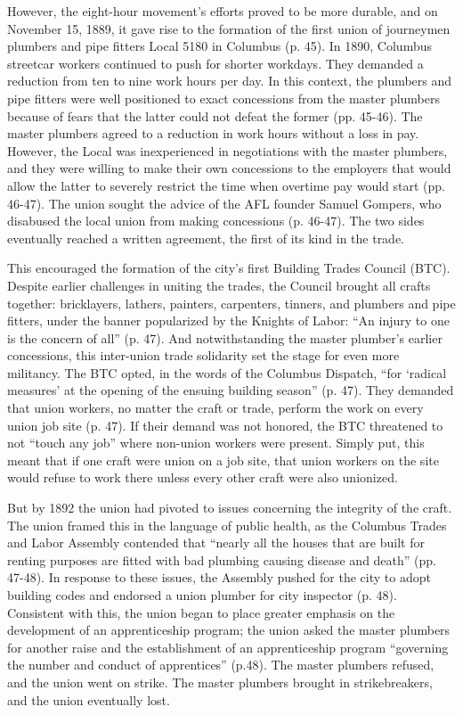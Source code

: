 However, the eight-hour movement’s efforts proved to be more durable, and on November 15, 1889, it gave rise to the formation of the first union of journeymen plumbers and pipe fitters Local 5180 in Columbus (p. 45). In 1890, Columbus streetcar workers continued to push for shorter workdays. They demanded a reduction from ten to nine work hours per day. In this context, the plumbers and pipe fitters were well positioned to exact concessions from the master plumbers because of fears that the latter could not defeat the former (pp. 45-46). The master plumbers agreed to a reduction in work hours without a loss in pay. However, the Local was inexperienced in negotiations with the master plumbers, and they were willing to make their own concessions to the employers that would allow the latter to severely restrict the time when overtime pay would start (pp. 46-47). The union sought the advice of the AFL founder Samuel Gompers, who disabused the local union from making concessions (p. 46-47). The two sides eventually reached a written agreement, the first of its kind in the trade. 

This encouraged the formation of the city’s first Building Trades Council (BTC). Despite earlier challenges in uniting the trades, the Council brought all crafts together: bricklayers, lathers, painters, carpenters, tinners, and plumbers and pipe fitters, under the banner popularized by the Knights of Labor: “An injury to one is the concern of all” (p. 47). And notwithstanding the master plumber’s earlier concessions, this inter-union trade solidarity set the stage for even more militancy. The BTC opted, in the words of the Columbus Dispatch, “for ‘radical measures’ at the opening of the ensuing building season” (p. 47). They demanded that union workers, no matter the craft or trade, perform the work on every union job site (p. 47). If their demand was not honored, the BTC threatened to not “touch any job” where non-union workers were present. Simply put, this meant that if one craft were union on a job site, that union workers on the site would refuse to work there unless every other craft were also unionized.

But by 1892 the union had pivoted to issues concerning the integrity of the craft. The union framed this in the language of public health, as the Columbus Trades and Labor Assembly contended that “nearly all the houses that are built for renting purposes are fitted with bad plumbing causing disease and death” (pp. 47-48). In response to these issues, the Assembly pushed for the city to adopt building codes and endorsed a union plumber for city inspector (p. 48). Consistent with this, the union began to place greater emphasis on the development of an apprenticeship program; the union asked the master plumbers for another raise and the establishment of an apprenticeship program “governing the number and conduct of apprentices” (p.48). The master plumbers refused, and the union went on strike. The master plumbers brought in strikebreakers, and the union eventually lost.

